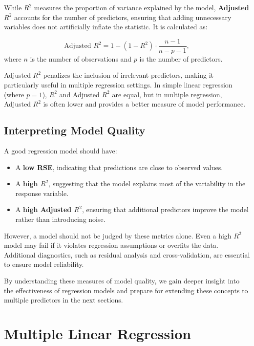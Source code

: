 \documentclass[
]{book}
\providecommand{\tightlist}{%
  \setlength{\itemsep}{0pt}\setlength{\parskip}{0pt}}
\theoremstyle{definition}
\theoremstyle{definition}
\theoremstyle{definition}
\theoremstyle{definition}
\theoremstyle{remark}
\begin{document}
While \(R^2\) measures the proportion of variance explained by the model, \textbf{Adjusted \(R^2\)} accounts for the number of predictors, ensuring that adding unnecessary variables does not artificially inflate the statistic. It is calculated as:

\[
\text{Adjusted } R^2 = 1 - \left(1 - R^2\right) \cdot \frac{n-1}{n-p-1},
\]
where \(n\) is the number of observations and \(p\) is the number of predictors.

Adjusted \(R^2\) penalizes the inclusion of irrelevant predictors, making it particularly useful in multiple regression settings. In simple linear regression (where \(p = 1\)), \(R^2\) and Adjusted \(R^2\) are equal, but in multiple regression, Adjusted \(R^2\) is often lower and provides a better measure of model performance.

\subsection*{Interpreting Model Quality}\label{interpreting-model-quality}

A good regression model should have:

\begin{itemize}
\tightlist
\item
  A \textbf{low RSE}, indicating that predictions are close to observed values.\\
\item
  A \textbf{high \(R^2\)}, suggesting that the model explains most of the variability in the response variable.\\
\item
  A \textbf{high Adjusted \(R^2\)}, ensuring that additional predictors improve the model rather than introducing noise.
\end{itemize}

However, a model should not be judged by these metrics alone. Even a high \(R^2\) model may fail if it violates regression assumptions or overfits the data. Additional diagnostics, such as residual analysis and cross-validation, are essential to ensure model reliability.

By understanding these measures of model quality, we gain deeper insight into the effectiveness of regression models and prepare for extending these concepts to multiple predictors in the next sections.

\section{Multiple Linear Regression}\label{sec-multiple-regression}
\end{document}
